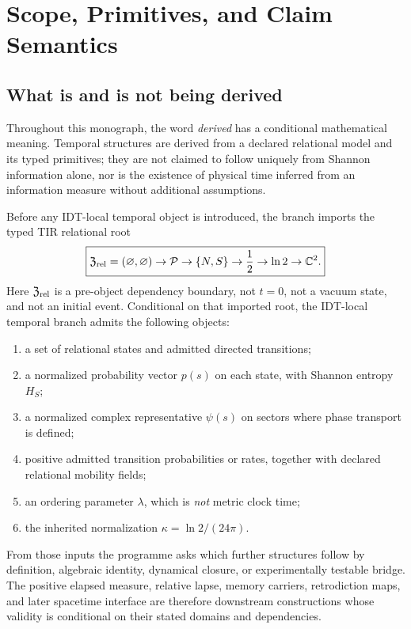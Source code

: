 \chapter*{Scope, Primitives, and Claim Semantics}

\section*{What is and is not being derived}

Throughout this monograph, the word \emph{derived} has a conditional mathematical meaning. Temporal structures are derived from a declared relational model and its typed primitives; they are not claimed to follow uniquely from Shannon information alone, nor is the existence of physical time inferred from an information measure without additional assumptions.

Before any IDT-local temporal object is introduced, the branch imports the typed TIR relational root
\[
\boxed{
\mathfrak Z_{\rm rel}=(\varnothing,\varnothing)
\to\mathcal P
\to\{N,S\}
\to\frac12
\to\ln2
\to\mathbb C^2.
}
\]
Here \(\mathfrak Z_{\rm rel}\) is a pre-object dependency boundary, not \(t=0\), not a vacuum state, and not an initial event. Conditional on that imported root, the IDT-local temporal branch admits the following objects:
\begin{enumerate}
\item a set of relational states and admitted directed transitions;
\item a normalized probability vector \(p(s)\) on each state, with Shannon entropy \(H_S\);
\item a normalized complex representative \(\psi(s)\) on sectors where phase transport is defined;
\item positive admitted transition probabilities or rates, together with declared relational mobility fields;
\item an ordering parameter \(\lambda\), which is \emph{not} metric clock time;
\item the inherited normalization \(\kappa=\ln 2/(24\pi)\).
\end{enumerate}

From those inputs the programme asks which further structures follow by definition, algebraic identity, dynamical closure, or experimentally testable bridge. The positive elapsed measure, relative lapse, memory carriers, retrodiction maps, and later spacetime interface are therefore downstream constructions whose validity is conditional on their stated domains and dependencies.

